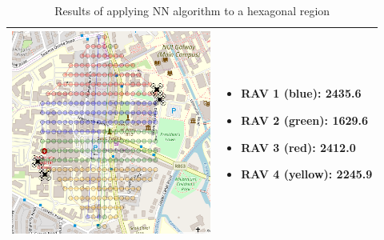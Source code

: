 \begin{table}[H]
\begin{tabular}{ | c | m{4.5cm} | }
    \begin{minipage}[c][69mm][c]{.6\textwidth}
      \includegraphics[width=\linewidth, height=67mm]{Chapters/MultiAgentCoverage/MultipleTravellingSalesman/Figs/Hexagon/FourRAV.PNG}
    \end{minipage}
    &
    \begin{itemize}[leftmargin=*]
    \item[] RAV 1 (blue): 2435.6
    \item[] RAV 2 (green): 1629.6
    \item[] RAV 3 (red): 2412.0
    \item[] RAV 4 (yellow): 2245.9
    \end{itemize}
    \\
    \hline
  \end{tabular}
  \caption{Results of applying NN algorithm to a hexagonal region}\label{table:NNAlgoResultsHex}
\end{table}



